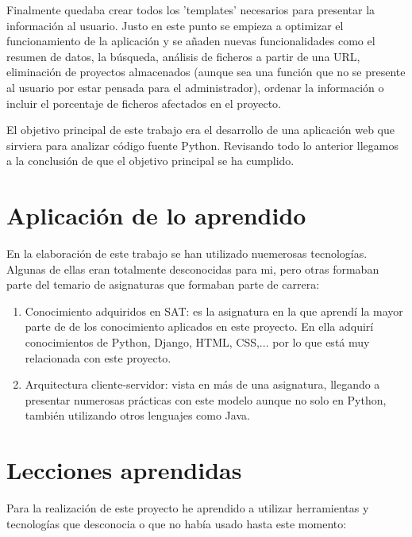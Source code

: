 \documentclass[a4paper, 12pt]{book}
\begin{document}
Finalmente quedaba crear todos los 'templates' necesarios para presentar la información al usuario. Justo en este punto se empieza a optimizar el funcionamiento de la aplicación y se añaden nuevas funcionalidades como el resumen de datos, la búsqueda, análisis de ficheros a partir de una URL, eliminación de proyectos almacenados (aunque sea una función que no se presente al usuario por estar pensada para el administrador), ordenar la información o incluir el porcentaje de ficheros afectados en el proyecto.

El objetivo principal de este trabajo era el desarrollo de una aplicación web que sirviera para analizar código fuente Python. Revisando todo lo anterior llegamos a la conclusión de que el objetivo principal se ha cumplido.

\section{Aplicación de lo aprendido}
\label{sec:aplicacion}
En la elaboración de este trabajo se han utilizado nuemerosas tecnologías. Algunas de ellas eran totalmente desconocidas para mi, pero otras formaban parte del temario de asignaturas que formaban parte de carrera:

\begin{enumerate}
  \item Conocimiento adquiridos en SAT: es la asignatura en la que aprendí la mayor parte de de los conocimiento aplicados en este proyecto. En ella adquirí conocimientos de Python, Django, HTML, CSS,... por lo que está muy relacionada con este proyecto.
  \item Arquitectura cliente-servidor: vista en más de una asignatura, llegando a presentar numerosas prácticas con este modelo aunque no solo en Python, también utilizando otros lenguajes como Java.
\end{enumerate}


\section{Lecciones aprendidas}
\label{sec:lecciones_aprendidas}
Para la realización de este proyecto he aprendido a utilizar herramientas y tecnologías que desconocia o que no había usado hasta este momento:
\end{document}
